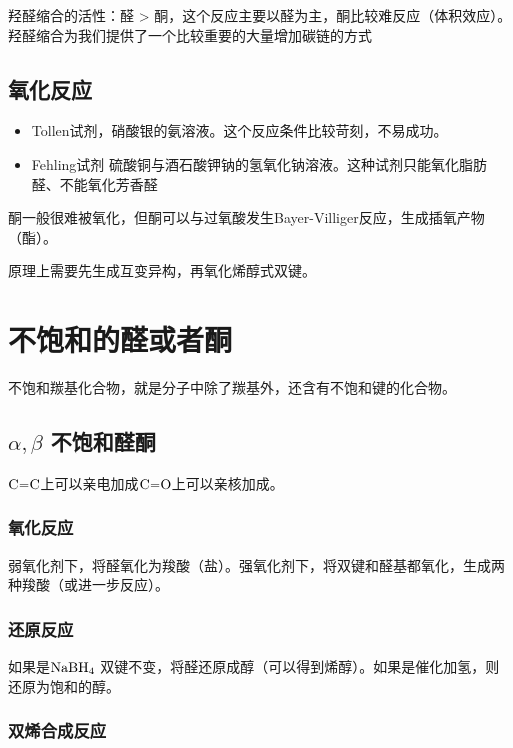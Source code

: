 \documentclass[a4paper]{ctexrep}
\begin{document}
    羟醛缩合的活性：醛 > 酮，这个反应主要以醛为主，酮比较难反应（体积效应）。羟醛缩合为我们提供了一个比较重要的大量增加碳链的方式

    \subsection{氧化反应}

    \begin{itemize}
        \item  Tollen试剂，硝酸银的氨溶液。这个反应条件比较苛刻，不易成功。
        \item  Fehling试剂 硫酸铜与酒石酸钾钠的氢氧化钠溶液。这种试剂只能氧化脂肪醛、不能氧化芳香醛
    \end{itemize}

    酮一般很难被氧化，但酮可以与过氧酸发生Bayer-Villiger反应，生成插氧产物（酯）。

    原理上需要先生成互变异构，再氧化烯醇式双键。

    \section{不饱和的醛或者酮}

    不饱和羰基化合物，就是分子中除了羰基外，还含有不饱和键的化合物。

    \subsection{$\alpha, \beta$ 不饱和醛酮}

    $\ce{C=C}$上可以亲电加成$\ce{C=O}$上可以亲核加成。

    \subsubsection{氧化反应}

    弱氧化剂下，将醛氧化为羧酸（盐）。强氧化剂下，将双键和醛基都氧化，生成两种羧酸（或进一步反应）。

    \subsubsection{还原反应}

    如果是$\ce{NaBH4}$ 双键不变，将醛还原成醇（可以得到烯醇）。如果是催化加氢，则还原为饱和的醇。

    \subsubsection{双烯合成反应}
\end{document}
